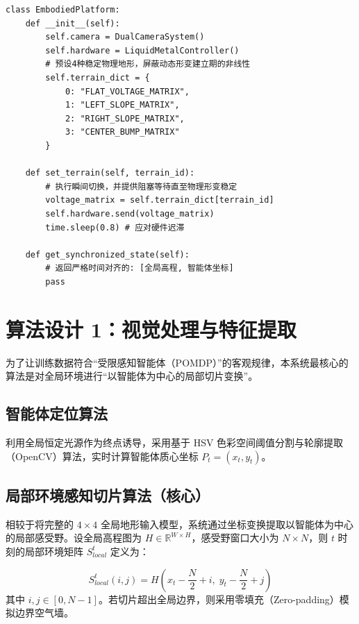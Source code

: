 \documentclass[a4paper,11pt]{ctexart}
\begin{document}
\begin{lstlisting}[caption={EmbodiedPlatform 核心接口伪代码}, aboveskip=4pt, belowskip=4pt]
class EmbodiedPlatform:
    def __init__(self):
        self.camera = DualCameraSystem()
        self.hardware = LiquidMetalController()
        # 预设4种稳定物理地形，屏蔽动态形变建立期的非线性
        self.terrain_dict = {
            0: "FLAT_VOLTAGE_MATRIX",
            1: "LEFT_SLOPE_MATRIX",
            2: "RIGHT_SLOPE_MATRIX",
            3: "CENTER_BUMP_MATRIX"
        }

    def set_terrain(self, terrain_id):
        # 执行瞬间切换，并提供阻塞等待直至物理形变稳定
        voltage_matrix = self.terrain_dict[terrain_id]
        self.hardware.send(voltage_matrix)
        time.sleep(0.8) # 应对硬件迟滞

    def get_synchronized_state(self):
        # 返回严格时间对齐的: [全局高程, 智能体坐标]
        pass
\end{lstlisting}

\section{算法设计 1：视觉处理与特征提取}

为了让训练数据符合“受限感知智能体（POMDP）”的客观规律，本系统最核心的算法是对全局环境进行“以智能体为中心的局部切片变换”。

\begin{samepage}
\subsection{智能体定位算法}
利用全局恒定光源作为终点诱导，采用基于 HSV 色彩空间阈值分割与轮廓提取（OpenCV）算法，实时计算智能体质心坐标 $P_t = (x_t, y_t)$。
\end{samepage}

\begin{samepage}
\subsection{局部环境感知切片算法（核心）}
相较于将完整的 $4 \times 4$ 全局地形输入模型，系统通过坐标变换提取以智能体为中心的局部感受野。设全局高程图为 $H \in \mathbb{R}^{W \times H}$，感受野窗口大小为 $N \times N$，则 $t$ 时刻的局部环境矩阵 $S_{local}^t$ 定义为：

\begin{equation}
    S_{local}^t(i, j) = H(x_t - \frac{N}{2} + i,\; y_t - \frac{N}{2} + j)
\end{equation}
其中 $i, j \in [0, N-1]$。若切片超出全局边界，则采用零填充（Zero-padding）模拟边界空气墙。
\end{samepage}
\end{document}
